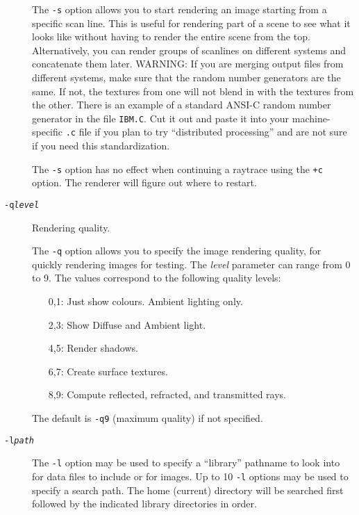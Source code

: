 \begin{description}
The {\tt -s} option allows you to start rendering an image starting
from a specific scan line.  This is useful for rendering part
of a scene to see what it looks like without having to render
the entire scene from the top.  Alternatively, you can render
groups of scanlines on different systems and concatenate them
later.  WARNING: If you are merging output files from different
systems, make sure that the random number generators are the
same.  If not, the textures from one will not blend in with the
textures from the other.  There is an example of a standard
ANSI-C random number generator in the file {\tt IBM.C}.  Cut it
out and paste it into your machine-specific {\tt .c} file if you
plan to try ``distributed processing'' and are not sure if you
need this standardization.

The {\tt -s} option has no effect when continuing a raytrace using
the {\tt +c} option.  The renderer will figure out where to restart.

\item[{\tt -q{\em level}}] %
Rendering quality.

The {\tt -q} option allows you to specify the image rendering quality,
for quickly rendering images for testing.  The {\em level} parameter can
range from 0 to 9.  The values correspond to the following
quality levels:

\begin{itemize}
\item[0,1:] Just show colours.  Ambient lighting only.
\noitemsep
\item[2,3:] Show Diffuse and Ambient light.
\item[4,5:] Render shadows.
\item[6,7:] Create surface textures.
\item[8,9:] Compute reflected, refracted, and transmitted rays.
\end{itemize}
\doitemsep

The default is {\tt -q9} (maximum quality) if not specified.

\item[{\tt -l{\em path}}] The {\tt -l}
option may be used to specify a ``library'' pathname to
look into for data files to include or for images.  Up to 10
{\tt -l} options may be used to specify a search path.  The home
(current) directory will be searched first followed by the
indicated library directories in order.


\end{description}
